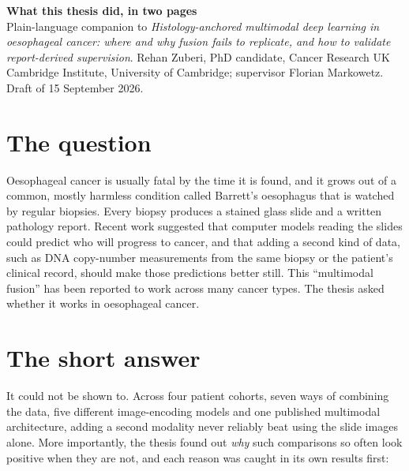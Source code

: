 \documentclass[11pt,a4paper]{article}
\begin{document}
{\Large\bfseries What this thesis did, in two pages}\\[2pt]
{\small Plain-language companion to \emph{Histology-anchored multimodal deep learning in oesophageal cancer: where and why fusion fails to replicate, and how to validate report-derived supervision}. Rehan Zuberi, PhD candidate, Cancer Research UK Cambridge Institute, University of Cambridge; supervisor Florian Markowetz. Draft of 15 September 2026.}

\section*{The question}
Oesophageal cancer is usually fatal by the time it is found, and it grows out of a common, mostly harmless condition called Barrett's oesophagus that is watched by regular biopsies. Every biopsy produces a stained glass slide and a written pathology report. Recent work suggested that computer models reading the slides could predict who will progress to cancer, and that adding a second kind of data, such as DNA copy-number measurements from the same biopsy or the patient's clinical record, should make those predictions better still. This ``multimodal fusion'' has been reported to work across many cancer types. The thesis asked whether it works in oesophageal cancer.

\section*{The short answer}
It could not be shown to. Across four patient cohorts, seven ways of combining the data, five different image-encoding models and one published multimodal architecture, adding a second modality never reliably beat using the slide images alone. More importantly, the thesis found out \emph{why} such comparisons so often look positive when they are not, and each reason was caught in its own results first:
\end{document}
